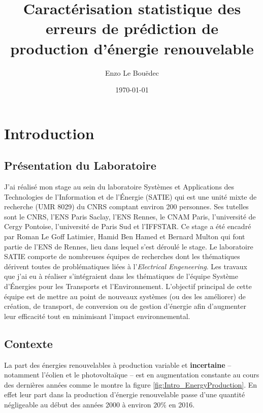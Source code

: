 \documentclass[12pt]{report}
\title{Caractérisation statistique des erreurs de prédiction de production d'énergie renouvelable}
\author{Enzo Le Bouëdec}
\date{\today}
\begin{document}
\maketitle
\tableofcontents

\printnomenclature

\chapter{Introduction}
\section{Présentation du Laboratoire}
J'ai réalisé mon stage au sein du laboratoire Systèmes et Applications des Technologies de l'Information et de l'Énergie (SATIE) qui est une unité mixte de recherche (UMR 8029) du CNRS comptant environ 200 personnes. Ses tutelles sont le CNRS, l'ENS Paris Saclay, l'ENS Rennes, le CNAM Paris, l'université de Cergy Pontoise, l'université de Paris Sud et l'IFFSTAR. Ce stage a été encadré par Roman Le Goff Latimier, Hamid Ben Hamed et Bernard Multon qui font partie de l'ENS de Rennes, lieu dans lequel s'est déroulé le stage. Le laboratoire SATIE comporte de nombreuses équipes de recherches dont les thématiques dérivent toutes de problématiques liées à l'\textit{Electrical Engeneering}. Les travaux que j'ai eu à réaliser s'intégraient dans les thématiques de l'équipe Système d'Énergies pour les Transports et l'Environnement. L'objectif principal de cette équipe est de mettre au point de nouveaux systèmes (ou des les améliorer) de création, de transport, de conversion ou de gestion d'énergie afin d'augmenter leur efficacité tout en minimisant l'impact environnemental.

\section{Contexte}

La part des énergies renouvelables à production variable et \textbf{incertaine} -- notamment l'éolien et le photovoltaïque -- est en augmentation constante au cours des dernières années comme le montre la figure \ref{fig:Intro_EnergyProduction}. En effet leur part dans la production d'énergie renouvelable passe d'une quantité négligeable au début des années 2000 à environ $20 \%$ en 2016.
\end{document}
